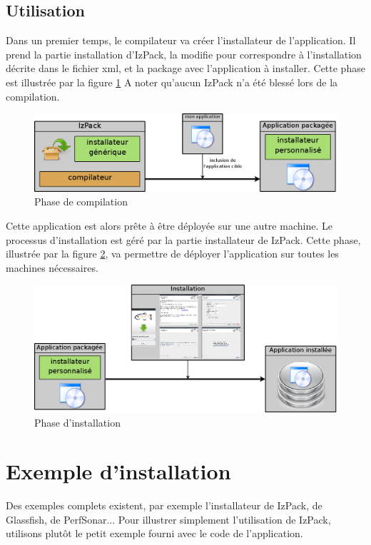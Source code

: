 \subsection{Utilisation}
Dans un premier temps, le compilateur va créer l'installateur de l'application.
Il prend la partie installation d'IzPack, la modifie pour correspondre à l'installation décrite dans le fichier xml, et la package avec l'application à installer. Cette phase est illustrée par la figure \ref{fig:partie_compil}
A noter qu'aucun IzPack n'a été blessé lors de la compilation.
\begin{figure}[H]
	\centering
	\includegraphics[width=\textwidth]{../image/partie_compil.png}
	\caption{Phase de compilation}
	\label{fig:partie_compil}
\end{figure}

Cette application est alors prête à être déployée sur une autre machine.
Le processus d'installation est géré par la partie installateur de IzPack.
Cette phase, illustrée par la figure \ref{fig:partie_install}, va permettre de déployer l'application sur toutes les machines nécessaires.
\begin{figure}[H]
	\centering
	\includegraphics[width=\textwidth]{../image/partie_install.png}
	\caption{Phase d'installation}
	\label{fig:partie_install}
\end{figure}

\section{Exemple d'installation}
Des exemples complets existent, par exemple l'installateur de IzPack, de Glassfish, de PerfSonar... 
Pour illustrer simplement l'utilisation de IzPack, utilisons plutôt le petit exemple fourni avec le code de l'application.
